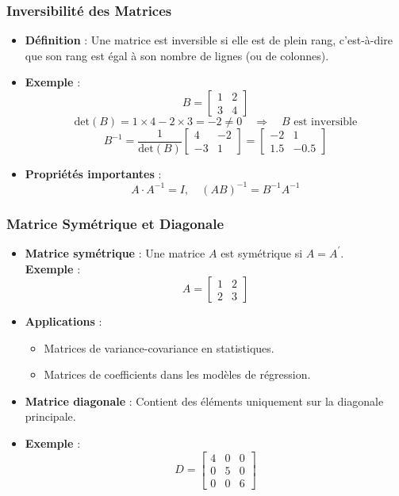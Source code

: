 \documentclass{beamer}
\begin{document}
\begin{frame}
  \frametitle{Inversibilité des Matrices}
  \begin{itemize}
    \item \textbf{Définition} : Une matrice est inversible si elle est de plein rang, c'est-à-dire que son rang est égal à son nombre de lignes (ou de colonnes).
    \item \textbf{Exemple} : 
    \[
    B = \begin{bmatrix} 
    1 & 2 \\ 
    3 & 4 
    \end{bmatrix}
    \]
    \[
    \text{det}(B) = 1 \times 4 - 2 \times 3 = -2 \neq 0 \quad \Rightarrow \quad B \text{ est inversible}
    \]
    \[
    B^{-1} = \frac{1}{\text{det}(B)} \begin{bmatrix} 
    4 & -2 \\ 
    -3 & 1 
    \end{bmatrix} = \begin{bmatrix} 
    -2 & 1 \\ 
    1.5 & -0.5 
    \end{bmatrix}
    \]
    \item \textbf{Propriétés importantes} :
      \[
      A \cdot A^{-1} = I, \quad (AB)^{-1} = B^{-1} A^{-1}
      \]
  \end{itemize}
\end{frame}

\begin{frame}
  \frametitle{Matrice Symétrique et Diagonale}
  \begin{itemize}
    \item \textbf{Matrice symétrique} : Une matrice \(A\) est symétrique si \(A = A^{\prime}\). \\
    \textbf{Exemple} : 
    \[
    A = \begin{bmatrix} 
    1 & 2 \\ 
    2 & 3 
    \end{bmatrix}
    \]
    \item \textbf{Applications} : 
      \begin{itemize}
        \item Matrices de variance-covariance en statistiques.
        \item Matrices de coefficients dans les modèles de régression.
      \end{itemize}
    \item \textbf{Matrice diagonale} : Contient des éléments uniquement sur la diagonale principale.
    \item \textbf{Exemple} :
    \[
    D = \begin{bmatrix} 
    4 & 0 & 0 \\ 
    0 & 5 & 0 \\ 
    0 & 0 & 6 
    \end{bmatrix}
    \]
  \end{itemize}
\end{frame}
\end{document}
